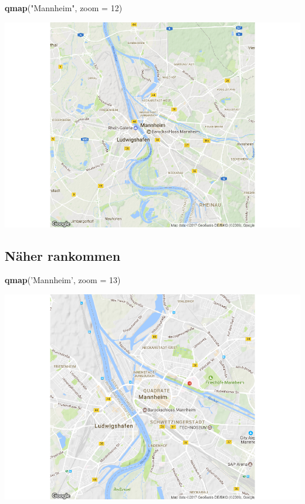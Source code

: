 \documentclass[]{article}
\newenvironment{Shaded}{\begin{snugshade}}{\end{snugshade}}
\newcommand{\KeywordTok}[1]{\textcolor[rgb]{0.13,0.29,0.53}{\textbf{{#1}}}}
\newcommand{\DataTypeTok}[1]{\textcolor[rgb]{0.13,0.29,0.53}{{#1}}}
\newcommand{\DecValTok}[1]{\textcolor[rgb]{0.00,0.00,0.81}{{#1}}}
\newcommand{\StringTok}[1]{\textcolor[rgb]{0.31,0.60,0.02}{{#1}}}
\newcommand{\NormalTok}[1]{{#1}}
\begin{document}
\begin{Shaded}
\begin{Highlighting}[]
\KeywordTok{qmap}\NormalTok{(}\StringTok{"Mannheim"}\NormalTok{, }\DataTypeTok{zoom =} \DecValTok{12}\NormalTok{)}
\end{Highlighting}
\end{Shaded}

\includegraphics{Intro_Datenanalyse1_files/figure-latex/unnamed-chunk-245-1.pdf}

\subsection{Näher rankommen}\label{naher-rankommen}

\begin{Shaded}
\begin{Highlighting}[]
\KeywordTok{qmap}\NormalTok{(}\StringTok{'Mannheim'}\NormalTok{, }\DataTypeTok{zoom =} \DecValTok{13}\NormalTok{)}
\end{Highlighting}
\end{Shaded}

\includegraphics{Intro_Datenanalyse1_files/figure-latex/unnamed-chunk-246-1.pdf}
\end{document}
